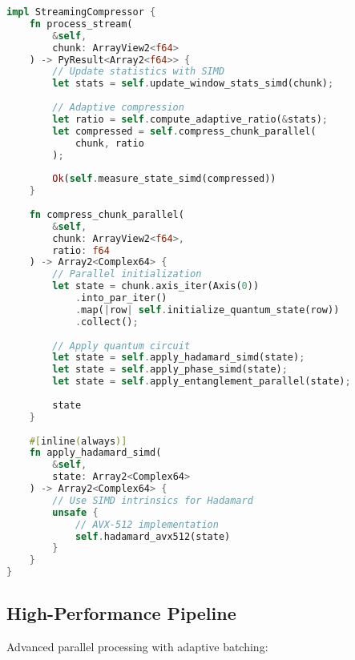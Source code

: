 \documentclass[10pt,twocolumn]{article}
\begin{document}
\begin{lstlisting}[language=Rust]
impl StreamingCompressor {
    fn process_stream(
        &self, 
        chunk: ArrayView2<f64>
    ) -> PyResult<Array2<f64>> {
        // Update statistics with SIMD
        let stats = self.update_window_stats_simd(chunk);
        
        // Adaptive compression
        let ratio = self.compute_adaptive_ratio(&stats);
        let compressed = self.compress_chunk_parallel(
            chunk, ratio
        );
        
        Ok(self.measure_state_simd(compressed))
    }
    
    fn compress_chunk_parallel(
        &self,
        chunk: ArrayView2<f64>,
        ratio: f64
    ) -> Array2<Complex64> {
        // Parallel initialization
        let state = chunk.axis_iter(Axis(0))
            .into_par_iter()
            .map(|row| self.initialize_quantum_state(row))
            .collect();
            
        // Apply quantum circuit
        let state = self.apply_hadamard_simd(state);
        let state = self.apply_phase_simd(state);
        let state = self.apply_entanglement_parallel(state);
        
        state
    }
    
    #[inline(always)]
    fn apply_hadamard_simd(
        &self, 
        state: Array2<Complex64>
    ) -> Array2<Complex64> {
        // Use SIMD intrinsics for Hadamard
        unsafe {
            // AVX-512 implementation
            self.hadamard_avx512(state)
        }
    }
}
\end{lstlisting}

\subsection{High-Performance Pipeline}
Advanced parallel processing with adaptive batching:
\end{document}
